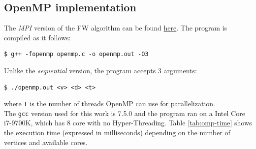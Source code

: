 \documentclass[compsoc]{IEEEtran}
\begin{document}
\subsection{OpenMP implementation}
The \emph{MPI} version of the FW algorithm can be found \href{https://github.com/firaja/Parallel-FloydWarshall/blob/master/openmp.c}{here}. 
The program is compiled as it follows:
\begin{lstlisting}[basicstyle=\footnotesize\ttfamily]
$ g++ -fopenmp openmp.c -o openmp.out -O3
\end{lstlisting}
Unlike the \emph{sequential} version, the program accepts 3 arguments:
\begin{lstlisting}[basicstyle=\footnotesize\ttfamily]
$ ./openmp.out <v> <d> <t>
\end{lstlisting}
where \texttt{t} is the number of threads OpenMP can use for parallelization. \\
The \texttt{gcc} version used for this work is 7.5.0 and the program ran on a Intel Core i7-9700K, which has 8 core with no Hyper-Threading.
Table \ref{tab:omp-time} shows the execution time (expressed in milliseconds) depending on the number of vertices and available cores.
\end{document}
